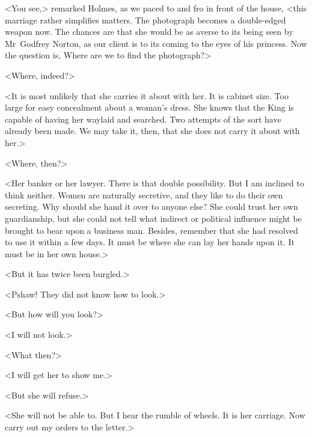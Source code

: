 <You see,> remarked Holmes, as we paced to and fro in front of the house, <this marriage rather simplifies matters. The photograph becomes a double-edged weapon now. The chances are that she would be as averse to its being seen by Mr~Godfrey Norton, as our client is to its coming to the eyes of his princess. Now the question is, Where are we to find the photograph?>

<Where, indeed?>

<It is most unlikely that she carries it about with her. It is cabinet size. Too large for easy concealment about a woman's dress. She knows that the King is capable of having her waylaid and searched. Two attempts of the sort have already been made. We may take it, then, that she does not carry it about with her.>

<Where, then?>

<Her banker or her lawyer. There is that double possibility. But I am inclined to think neither. Women are naturally secretive, and they like to do their own secreting. Why should she hand it over to anyone else? She could trust her own guardianship, but she could not tell what indirect or political influence might be brought to bear upon a business man. Besides, remember that she had resolved to use it within a few days. It must be where she can lay her hands upon it. It must be in her own house.>

<But it has twice been burgled.>

<Pshaw! They did not know how to look.>

<But how will you look?>

<I will not look.>

<What then?>

<I will get her to show me.>

<But she will refuse.>

<She will not be able to. But I hear the rumble of wheels. It is her carriage. Now carry out my orders to the letter.>

